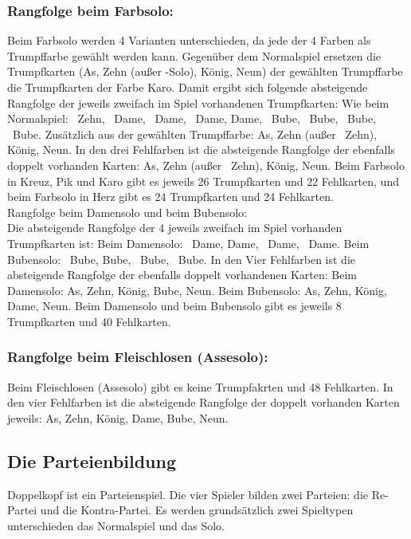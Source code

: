 \documentclass[12pt]{scrartcl}
\begin{document}
\subsubsection{Rangfolge beim Farbsolo:}
Beim Farbsolo werden 4 Varianten unterschieden, da jede der 4
Farben als Trumpffarbe gewählt werden kann. Gegenüber dem
Normalspiel ersetzen die Trumpfkarten (As, Zehn (außer \Herz
-Solo), König, Neun) der gewählten Trumpffarbe die Trumpfkarten
der Farbe Karo. Damit ergibt sich folgende absteigende Rangfolge
der jeweils zweifach im Spiel vorhandenen Trumpfkarten: Wie beim
Normalspiel: \Herz\ Zehn, \Kreuz\ Dame, \Pik\ Dame, \Herz\ Dame, \Karo
Dame, \Kreuz\ Bube, \Pik\ Bube, \Herz\ Bube, \Karo\ Bube. Zusätzlich
aus der gewählten Trumpffarbe: As, Zehn (außer \Herz\ Zehn),
König, Neun. In den drei Fehlfarben ist die absteigende
Rangfolge der ebenfalls doppelt vorhanden Karten: As, Zehn (außer
\Herz\ Zehn), König, Neun. Beim Farbsolo in Kreuz, Pik und Karo
gibt es jeweils 26 Trumpfkarten und 22 Fehlkarten, und beim
Farbsolo in Herz
gibt es 24 Trumpfkarten und 24 Fehlkarten.\\
Rangfolge beim Damensolo und beim Bubensolo:\\
Die absteigende Rangfolge der 4 jeweils zweifach im Spiel
vorhanden Trumpfkarten ist: Beim Damensolo: \Kreuz\ Dame, \Pik
Dame, \Herz\ Dame, \Karo\ Dame. Beim Bubensolo: \Kreuz\ Bube, \Pik
Bube, \Herz\ Bube, \Karo\ Bube. In den Vier Fehlfarben ist die
absteigende Rangfolge der ebenfalls doppelt vorhandenen Karten:
Beim Damensolo: As, Zehn, König, Bube, Neun. Beim Bubensolo: As,
Zehn, König, Dame, Neun. Beim Damensolo und beim Bubensolo gibt
es jeweils 8 Trumpfkarten und 40 Fehlkarten.

\subsubsection{Rangfolge beim Fleischlosen (Assesolo):}
Beim Fleischlosen (Assesolo) gibt es keine Trumpfakrten und 48
Fehlkarten. In den vier Fehlfarben ist die absteigende Rangfolge
der doppelt vorhanden Karten jeweils: As, Zehn, König, Dame,
Bube, Neun.

\subsection{Die Parteienbildung}
Doppelkopf ist ein Parteienspiel. Die vier Spieler bilden zwei
Parteien: die Re-Partei und die Kontra-Partei. Es werden
grundsätzlich zwei Spieltypen unterschieden das Normalspiel und
das Solo.
\end{document}
